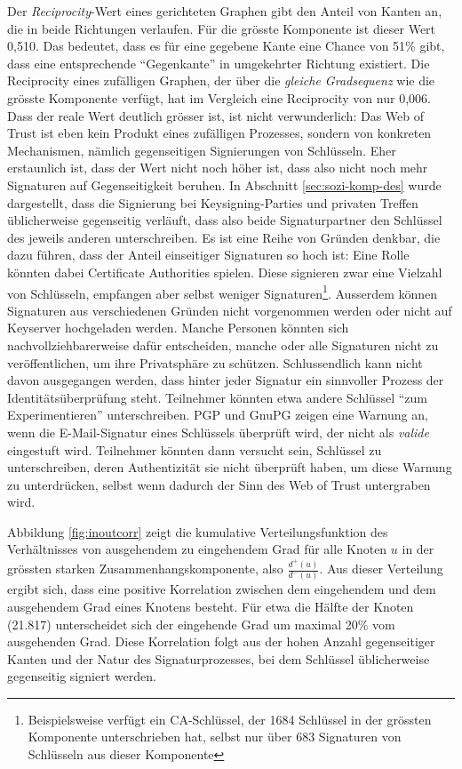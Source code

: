 Der \emph{Reciprocity}-Wert eines gerichteten Graphen gibt den Anteil
von Kanten an, die in beide Richtungen verlaufen. F\"ur die gr\"osste
Komponente ist dieser Wert 0,510. Das bedeutet, dass es f\"ur eine
gegebene Kante eine Chance von 51\% gibt, dass eine entsprechende
``Gegenkante'' in umgekehrter Richtung existiert. Die Reciprocity
eines zuf\"alligen Graphen, der \"uber die \emph{gleiche Gradsequenz}
wie die gr\"osste Komponente verf\"ugt, hat im Vergleich eine
Reciprocity von nur 0,006. Dass der reale Wert deutlich gr\"osser ist,
ist nicht verwunderlich: Das Web of Trust ist eben kein Produkt eines
zuf\"alligen Prozesses, sondern von konkreten Mechanismen, n\"amlich
gegenseitigen Signierungen von Schl\"usseln. Eher erstaunlich ist,
dass der Wert nicht noch h\"oher ist, dass also nicht noch mehr
Signaturen auf Gegenseitigkeit beruhen. In Abschnitt
\ref{sec:sozi-komp-des} wurde dargestellt, dass die Signierung bei
Keysigning-Parties und privaten Treffen \"ublicherweise gegenseitig
verl\"auft, dass also beide Signaturpartner den Schl\"ussel des
jeweils anderen unterschreiben. Es ist eine Reihe von Gr\"unden
denkbar, die dazu f\"uhren, dass der Anteil einseitiger Signaturen so
hoch ist: Eine Rolle k\"onnten dabei Certificate Authorities
spielen. Diese signieren zwar eine Vielzahl von Schl\"usseln,
empfangen aber selbst weniger Signaturen\footnote{Beispielsweise
  verf\"ugt ein CA-Schl\"ussel, der 1684 Schl\"ussel in der gr\"ossten
  Komponente unterschrieben hat, selbst nur \"uber 683 Signaturen von
  Schl\"usseln aus dieser Komponente}. Ausserdem k\"onnen Signaturen
aus verschiedenen Gr\"unden nicht vorgenommen werden oder nicht auf
Keyserver hochgeladen werden. Manche Personen k\"onnten sich
nachvollziehbarerweise daf\"ur entscheiden, manche oder alle
Signaturen nicht zu ver\"offentlichen, um ihre Privatsph\"are zu
sch\"utzen. Schlussendlich kann nicht davon ausgegangen werden, dass
hinter jeder Signatur ein sinnvoller Prozess der
Identit\"ats\"uberpr\"ufung steht. Teilnehmer k\"onnten etwa andere
Schl\"ussel ``zum Experimentieren'' unterschreiben. PGP und GnuPG
zeigen eine Warnung an, wenn die E-Mail-Signatur eines Schl\"ussels
\"uberpr\"uft wird, der nicht als \emph{valide} eingestuft
wird. Teilnehmer k\"onnten dann versucht sein, Schl\"ussel zu
unterschreiben, deren Authentizit\"at sie nicht \"uberpr\"uft haben,
um diese Warnung zu unterdr\"ucken, selbst wenn dadurch der Sinn des
Web of Trust untergraben wird.

Abbildung \ref{fig:inoutcorr} zeigt die kumulative Verteilungsfunktion
des Verh\"altnisses von ausgehendem zu eingehendem Grad f\"ur alle
Knoten $u$ in der gr\"ossten starken Zusammenhangskomponente, also
$\frac{d^+(u)}{d^-(u)}$. Aus dieser Verteilung ergibt sich, dass eine
positive Korrelation zwischen dem eingehendem und dem ausgehendem Grad
eines Knotens besteht. F\"ur etwa die H\"alfte der Knoten (21.817)
unterscheidet sich der eingehende Grad um maximal 20\% vom ausgehenden
Grad. Diese Korrelation folgt aus der hohen Anzahl gegenseitiger
Kanten und der Natur des Signaturprozesses, bei dem Schl\"ussel
\"ublicherweise gegenseitig signiert werden.

